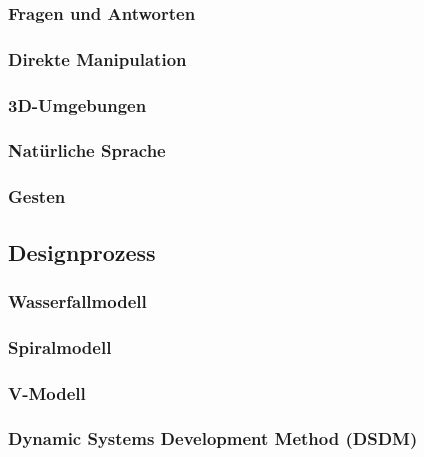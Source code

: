 \documentclass[a4paper, 11pt, accentcolor = tud3b]{tudreport}
\begin{document}
				\subsubsection{Fragen und Antworten} %

				\subsubsection{Direkte Manipulation} %

				\subsubsection{3D-Umgebungen} %

				\subsubsection{Natürliche Sprache} %

				\subsubsection{Gesten} %

			\subsection{Designprozess} %

				\subsubsection{Wasserfallmodell} %

				\subsubsection{Spiralmodell} %

				\subsubsection{V-Modell} %

				\subsubsection{Dynamic Systems Development Method (DSDM)} %
\end{document}
